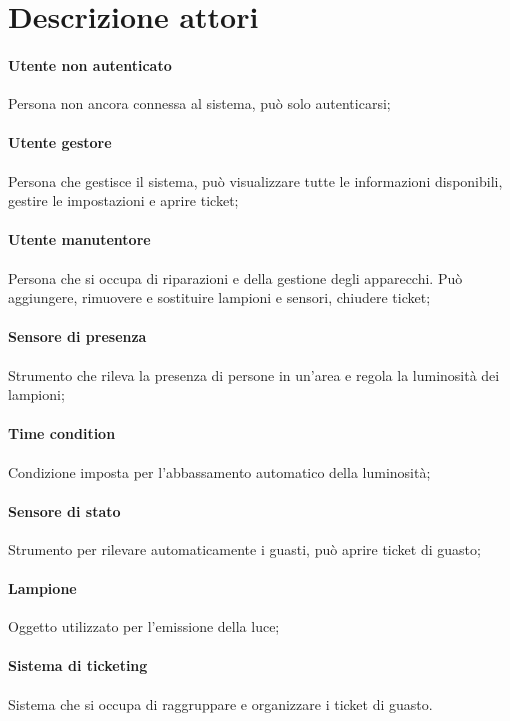 \section{Descrizione attori}\label{attori}
\paragraph{Utente non autenticato} 
Persona non ancora connessa al sistema, può solo autenticarsi;

\paragraph{Utente gestore} 
Persona che gestisce il sistema, può visualizzare tutte le informazioni disponibili, gestire le impostazioni e aprire ticket;

\paragraph{Utente manutentore} 
Persona che si occupa di riparazioni e della gestione degli apparecchi. Può aggiungere, rimuovere e sostituire lampioni e sensori, chiudere ticket;

\paragraph{Sensore di presenza} 
Strumento che rileva la presenza di persone in un'area e regola la luminosità dei lampioni;

\paragraph{Time condition}
Condizione imposta per l'abbassamento automatico della luminosità;

\paragraph{Sensore di stato} 
Strumento per rilevare automaticamente i guasti, può aprire ticket di guasto;

\paragraph{Lampione} 
Oggetto utilizzato per l'emissione della luce;

\paragraph{Sistema di ticketing}
Sistema che si occupa di raggruppare e organizzare i ticket di guasto.

